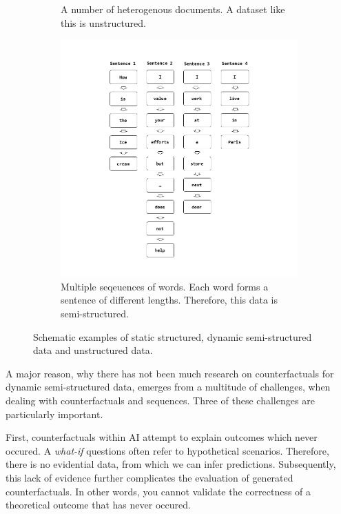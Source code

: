 \documentclass[./../../paper.tex]{subfiles}
\begin{document}
\begin{figure}
\begin{subfigure}[c]{0.49\textwidth}
        \caption{A number of heterogenous documents. A dataset like this is unstructured.}
        \label{fig:unstructured}
    \end{subfigure}
    \hfill
    \begin{subfigure}[c]{0.7\textwidth}
        \centering
        \includegraphics[width=\textwidth]{figures/Graphics/Slide2.png}
        \caption{Multiple seqeuences of words. Each word forms a sentence of different lengths. Therefore, this data is semi-structured.}
        \label{fig:semistructured}
    \end{subfigure}
       \caption{Schematic examples of static structured, dynamic semi-structured data and unstructured data.}
       \label{fig:example_structure}
\end{figure}


A major reason, why there has not been much research on counterfactuals for dynamic semi-structured data, emerges from a multitude of challenges, when dealing with counterfactuals and sequences. Three of these challenges are particularly important.
 
First, counterfactuals within AI attempt to explain outcomes which never occured. A \emph{what-if} questions often refer to hypothetical scenarios. Therefore, there is no evidential data, from which we can infer predictions. Subsequently, this lack of evidence further complicates the evaluation of generated counterfactuals. In other words, you cannot validate the correctness of a theoretical outcome that has never occured.
\end{document}
